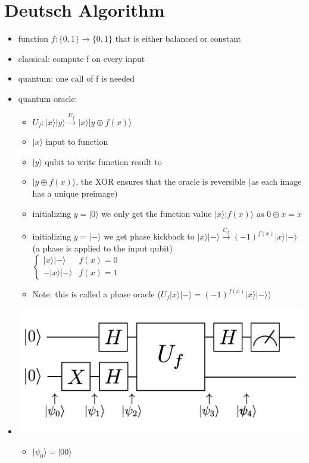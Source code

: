 \documentclass[12pt,a4paper]{article}
\newcommand{\ecb}[1]{\{#1\}}
\newcommand{\ket}[1]{\vert #1 \rangle}
\begin{document}
\section{Deutsch Algorithm}
\begin{itemize}
\item function $f : \ecb{0,1}\rightarrow \ecb{0,1}$ that is either balanced or constant
\item classical: compute f on every input
\item quantum: one call of f is needed
\item quantum oracle:
\begin{itemize}
\item $U_f : \ket{x}\ket{y} \xrightarrow{U_f} \ket{x}\ket{y\oplus f(x)}$
\item $\ket{x}$ input to function
\item $\ket{y}$ qubit to write function result to
\item $\ket{y\oplus f(x)}$, the XOR ensures that the oracle is reversible (as each image has a unique preimage)
\item initializing $y = \ket{0}$ we only get the function value $\ket{x}\ket{f(x)}$ as $0\oplus x = x$
\item initializing $y = \ket{-}$ we get phase kickback to $\ket{x}\ket{-} \xrightarrow{U_f} (-1)^{f(x)} \ket{x}\ket{-}$ (a phase is applied to the input qubit)\\$\begin{cases} \ket{x}\ket{-} & f(x)=0 \\ -\ket{x}\ket{-} & f(x)=1 \end{cases}$
\item Note: this is called a phase oracle ($U_f \ket{x}\ket{-} = (-1)^{f(x)}\ket{x}\ket{-}$)
\end{itemize}
\item \includegraphics[scale=0.2]{./resources/deutschplan.png}
\begin{itemize}
\item $\ket{\psi_0} = \ket{00}$

\end{itemize}
\end{itemize}
\end{document}
